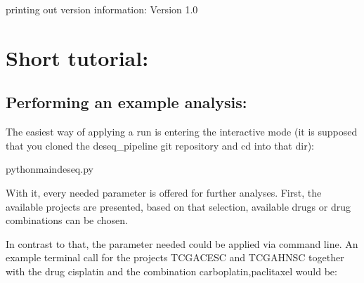 \documentclass[letterpaper,10pt,english]{sphinxmanual}
\begin{document}

\begin{fulllineitems}
\label{\detokenize{index:cmdoption-TreMSuc-v}}\label{\detokenize{index:cmdoption-TreMSuc-version}}
\pysigstartsignatures
{}
\pysigstopsignatures
\sphinxAtStartPar
printing out version information: Version 1.0

\end{fulllineitems}



\chapter{Short tutorial:}
\label{\detokenize{index:short-tutorial}}

\section{Performing an example analysis:}
\label{\detokenize{index:performing-an-example-analysis}}
\sphinxAtStartPar
The easiest way of applying a run is entering the interactive mode (it is
supposed that you cloned the deseq\_pipeline git repository and cd into that
dir):

\begin{sphinxVerbatim}[commandchars=\\\{\}]
\PYGZdl{}pythonmain\PYGZus{}deseq.py
\end{sphinxVerbatim}

\sphinxAtStartPar
With it, every needed parameter is offered for further analyses. First, the
available projects are presented, based on that selection, available drugs
or drug combinations can be chosen.

\sphinxAtStartPar
In contrast to that, the parameter needed could be applied via command line.
An example terminal call for the projects TCGA\sphinxhyphen{}CESC and TCGA\sphinxhyphen{}HNSC together with
the drug cisplatin and the combination carboplatin,paclitaxel would be:
\end{document}
